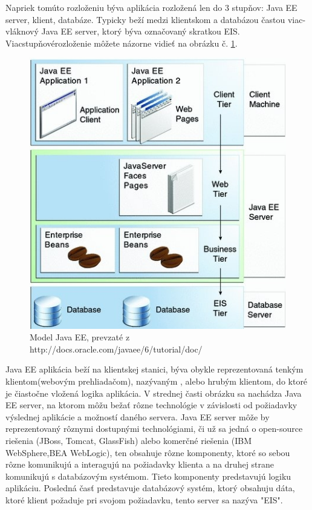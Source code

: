 Napriek tomúto rozloženiu býva aplikácia rozložená len do 3 stupňov: Java EE server, klient, databáze. Typicky beží medzi klientskom a databázou častou viac-vláknový Java EE server, ktorý býva označovaný skratkou EIS. Viacstupňovérozloženie môžete názorne vidieť na obrázku č. \ref{model}.
\begin{figure}[htb]

\begin{center}

\includegraphics[scale=0.5]{model.jpg} 
\caption{Model Java EE, prevzaté z  http://docs.oracle.com/javaee/6/tutorial/doc/}
\label{model}

\end{center}

\end{figure}
Java EE aplikácia beží na klientskej stanici, býva obykle reprezentovaná tenkým klientom(webovým prehliadačom), nazývaným , alebo hrubým klientom, do ktoré je čiastočne vložená logika aplikácia. V strednej časti obrázku sa nachádza Java EE server, na ktorom môžu bežať rôzne technológie v závislosti od požiadavky výslednej aplikácie a možností daného servera. Java EE server môže by reprezentovaný rôznymi dostupnými technológiami, či už sa jedná o open-source riešenia (JBoss, Tomcat, GlassFish) alebo komerčné riešenia (IBM WebSphere,BEA WebLogic), ten obsahuje rôzne komponenty, ktoré so sebou rôzne komunikujú a interagujú na požiadavky klienta a na druhej strane komunikujú s databázovým systémom. Tieto komponenty predstavujú logiku aplikáciu. Posledná časť predstavuje databázový systém, ktorý obsahuju dáta, ktoré klient požaduje pri svojom požiadavku, tento server sa nazýva "EIS".
\newpage
